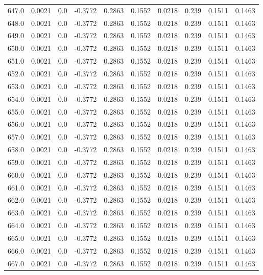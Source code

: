 \begin{longtable}{lrrrrrrrrr}
647.0 & 0.0021 & 0.0 & -0.3772 & 0.2863 & 0.1552 & 0.0218 & 0.239 & 0.1511 & 0.1463 \\
648.0 & 0.0021 & 0.0 & -0.3772 & 0.2863 & 0.1552 & 0.0218 & 0.239 & 0.1511 & 0.1463 \\
649.0 & 0.0021 & 0.0 & -0.3772 & 0.2863 & 0.1552 & 0.0218 & 0.239 & 0.1511 & 0.1463 \\
650.0 & 0.0021 & 0.0 & -0.3772 & 0.2863 & 0.1552 & 0.0218 & 0.239 & 0.1511 & 0.1463 \\
651.0 & 0.0021 & 0.0 & -0.3772 & 0.2863 & 0.1552 & 0.0218 & 0.239 & 0.1511 & 0.1463 \\
652.0 & 0.0021 & 0.0 & -0.3772 & 0.2863 & 0.1552 & 0.0218 & 0.239 & 0.1511 & 0.1463 \\
653.0 & 0.0021 & 0.0 & -0.3772 & 0.2863 & 0.1552 & 0.0218 & 0.239 & 0.1511 & 0.1463 \\
654.0 & 0.0021 & 0.0 & -0.3772 & 0.2863 & 0.1552 & 0.0218 & 0.239 & 0.1511 & 0.1463 \\
655.0 & 0.0021 & 0.0 & -0.3772 & 0.2863 & 0.1552 & 0.0218 & 0.239 & 0.1511 & 0.1463 \\
656.0 & 0.0021 & 0.0 & -0.3772 & 0.2863 & 0.1552 & 0.0218 & 0.239 & 0.1511 & 0.1463 \\
657.0 & 0.0021 & 0.0 & -0.3772 & 0.2863 & 0.1552 & 0.0218 & 0.239 & 0.1511 & 0.1463 \\
658.0 & 0.0021 & 0.0 & -0.3772 & 0.2863 & 0.1552 & 0.0218 & 0.239 & 0.1511 & 0.1463 \\
659.0 & 0.0021 & 0.0 & -0.3772 & 0.2863 & 0.1552 & 0.0218 & 0.239 & 0.1511 & 0.1463 \\
660.0 & 0.0021 & 0.0 & -0.3772 & 0.2863 & 0.1552 & 0.0218 & 0.239 & 0.1511 & 0.1463 \\
661.0 & 0.0021 & 0.0 & -0.3772 & 0.2863 & 0.1552 & 0.0218 & 0.239 & 0.1511 & 0.1463 \\
662.0 & 0.0021 & 0.0 & -0.3772 & 0.2863 & 0.1552 & 0.0218 & 0.239 & 0.1511 & 0.1463 \\
663.0 & 0.0021 & 0.0 & -0.3772 & 0.2863 & 0.1552 & 0.0218 & 0.239 & 0.1511 & 0.1463 \\
664.0 & 0.0021 & 0.0 & -0.3772 & 0.2863 & 0.1552 & 0.0218 & 0.239 & 0.1511 & 0.1463 \\
665.0 & 0.0021 & 0.0 & -0.3772 & 0.2863 & 0.1552 & 0.0218 & 0.239 & 0.1511 & 0.1463 \\
666.0 & 0.0021 & 0.0 & -0.3772 & 0.2863 & 0.1552 & 0.0218 & 0.239 & 0.1511 & 0.1463 \\
667.0 & 0.0021 & 0.0 & -0.3772 & 0.2863 & 0.1552 & 0.0218 & 0.239 & 0.1511 & 0.1463 \\

\end{longtable}
